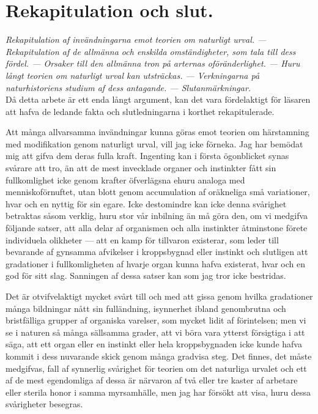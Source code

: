 

\chapter{Rekapitulation och slut.}

{\it
Rekapitulation af invändningarna emot teorien om naturligt urval. — Rekapitulation af de allmänna och enskilda omständigheter, som tala till dess fördel. — Orsaker till den allmänna tron på arternas oföränderlighet. — Huru långt teorien om naturligt urval kan utsträckas. — Verkningarna på naturhistoriens studium af dess antagande. — Slutanmärkningar.
}\\[0.5cm]

Då detta arbete är ett enda långt argument, kan det vara fördelaktigt för läsaren att hafva de ledande fakta och slutledningarna i korthet rekapitulerade.

Att många allvarsamma invändningar kunna göras emot teorien om härstamning med modifikation genom naturligt urval, vill jag icke förneka. Jag har bemödat mig att gifva dem deras fulla kraft. Ingenting kan i första ögonblicket synas svårare att tro, än att de mest invecklade organer och instinkter fått sin fullkomlighet icke genom krafter öfverlägsna ehuru analoga med menniskoförnuftet, utan blott genom accumulation af oräkneliga små variationer, hvar och en nyttig för sin egare. Icke destomindre kan icke denna svårighet betraktas såsom verklig, huru stor vår inbilning än må göra den, om vi medgifva följande satser, att alla delar af organismen och alla instinkter åtminstone förete individuela olikheter — att en kamp för tillvaron existerar, som leder till bevarande af gynsamma afvikelser i kroppsbygnad eller instinkt och slutligen att gradationer i fullkomligheten af hvarje organ kunna hafva existerat, hvar och en god för sitt slag. Sanningen af dessa satser kan som jag tror icke bestridas.

Det är otvifvelaktigt mycket svårt till och med att gissa genom hvilka gradationer många bildningar nått sin fulländning, isynnerhet ibland genombrutna och bristfälliga grupper af organiska varelser, som mycket lidit af förintelsen; men vi se i naturen så många sällsamma grader, att vi böra vara ytterst försigtiga i att säga, att ett organ eller en instinkt eller hela kroppsbygnaden icke kunde hafva kommit i dess nuvarande skick genom många gradvisa steg. Det finnes, det måste medgifvas, fall af synnerlig svårighet för teorien om det naturliga urvalet och ett af de mest egendomliga af dessa är närvaron af två eller tre kaster af arbetare eller sterila honor i samma myrsamhälle, men jag har försökt att visa, huru dessa svårigheter besegras.

